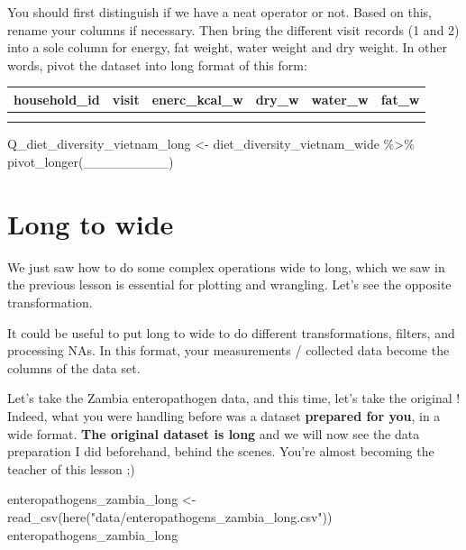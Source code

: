 \documentclass[
  letterpaper,
  DIV=11,
  numbers=noendperiod]{scrreprt}
\newenvironment{Shaded}{\begin{snugshade}}{\end{snugshade}}
\newcommand{\FunctionTok}[1]{\textcolor[rgb]{0.28,0.35,0.67}{#1}}
\newcommand{\NormalTok}[1]{\textcolor[rgb]{0.00,0.23,0.31}{#1}}
\newcommand{\OtherTok}[1]{\textcolor[rgb]{0.00,0.23,0.31}{#1}}
\newcommand{\SpecialCharTok}[1]{\textcolor[rgb]{0.37,0.37,0.37}{#1}}
\newcommand{\StringTok}[1]{\textcolor[rgb]{0.13,0.47,0.30}{#1}}
\begin{document}
\begin{tcolorbox}
You should first distinguish if we have a neat operator or not. Based on
this, rename your columns if necessary. Then bring the different visit
records (1 and 2) into a sole column for energy, fat weight, water
weight and dry weight. In other words, pivot the dataset into long
format of this form:

\begin{longtable}[]{@{}llllll@{}}
\toprule\noalign{}
household\_id & visit & enerc\_kcal\_w & dry\_w & water\_w & fat\_w \\
\midrule\noalign{}
\endhead
\bottomrule\noalign{}
\endlastfoot
& & & & & \\
& & & & & \\
\end{longtable}

\begin{Shaded}
\begin{Highlighting}[]
\NormalTok{Q\_diet\_diversity\_vietnam\_long }\OtherTok{\textless{}{-}}
\NormalTok{  diet\_diversity\_vietnam\_wide }\SpecialCharTok{\%\textgreater{}\%}
  \FunctionTok{pivot\_longer}\NormalTok{(\_\_\_\_\_\_\_\_\_)}
\end{Highlighting}
\end{Shaded}

\end{tcolorbox}

\section{Long to wide}\label{long-to-wide}

We just saw how to do some complex operations wide to long, which we saw
in the previous lesson is essential for plotting and wrangling. Let's
see the opposite transformation.

It could be useful to put long to wide to do different transformations,
filters, and processing NAs. In this format, your measurements /
collected data become the columns of the data set.

Let's take the Zambia enteropathogen data, and this time, let's take the
original ! Indeed, what you were handling before was a dataset
\textbf{prepared for you}, in a wide format. \textbf{The original
dataset is long} and we will now see the data preparation I did
beforehand, behind the scenes. You're almost becoming the teacher of
this lesson ;)

\begin{Shaded}
\begin{Highlighting}[]
\NormalTok{enteropathogens\_zambia\_long }\OtherTok{\textless{}{-}} \FunctionTok{read\_csv}\NormalTok{(}\FunctionTok{here}\NormalTok{(}\StringTok{"data/enteropathogens\_zambia\_long.csv"}\NormalTok{))}
\NormalTok{enteropathogens\_zambia\_long}
\end{Highlighting}
\end{Shaded}
\end{document}
